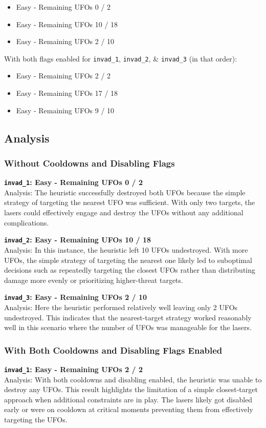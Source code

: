 \documentclass[12pt]{article}
\begin{document}
\begin{itemize}
    \item Easy - Remaining UFOs 0 / 2
    \item Easy - Remaining UFOs 10 / 18
    \item Easy - Remaining UFOs 2 / 10
\end{itemize}

With both flags enabled for \texttt{invad\_1}, \texttt{invad\_2}, \& \texttt{invad\_3} (in that order):

\begin{itemize}
    \item Easy - Remaining UFOs 2 / 2
    \item Easy - Remaining UFOs 17 / 18
    \item Easy - Remaining UFOs 9 / 10
\end{itemize}

\subsection{Analysis}
\subsubsection{Without Cooldowns and Disabling Flags}
\textbf{\texttt{invad\_1}: Easy - Remaining UFOs 0 / 2}\\
Analysis: The heuristic successfully destroyed both UFOs because the simple strategy of targeting the nearest UFO was sufficient. With only two targets, the lasers could effectively engage and destroy the UFOs without any additional complications.

\textbf{\texttt{invad\_2}: Easy - Remaining UFOs 10 / 18}\\
Analysis: In this instance, the heuristic left 10 UFOs undestroyed. With more UFOs, the simple strategy of targeting the nearest one likely led to suboptimal decisions such as repeatedly targeting the closest UFOs rather than distributing damage more evenly or prioritizing higher-threat targets.

\textbf{\texttt{invad\_3}: Easy - Remaining UFOs 2 / 10}\\
Analysis: Here the heuristic performed relatively well leaving only 2 UFOs undestroyed. This indicates that the nearest-target strategy worked reasonably well in this scenario where the number of UFOs was manageable for the lasers.

\subsubsection{With Both Cooldowns and Disabling Flags Enabled}
\textbf{\texttt{invad\_1}: Easy - Remaining UFOs 2 / 2}\\
Analysis: With both cooldowns and disabling enabled, the heuristic was unable to destroy any UFOs. This result highlights the limitation of a simple closest-target approach when additional constraints are in play. The lasers likely got disabled early or were on cooldown at critical moments preventing them from effectively targeting the UFOs.
\end{document}
